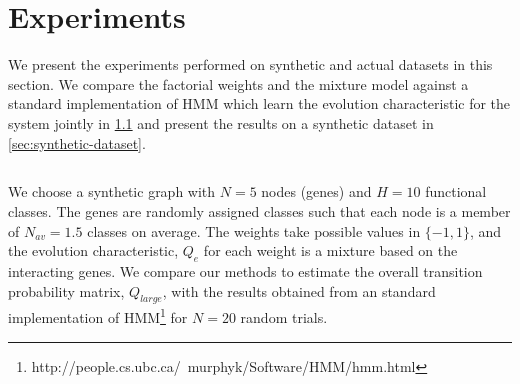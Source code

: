 \documentclass{bioinfo}
\begin{document}
\begin{methods}



\end{methods}
\section{Experiments}
We present the experiments performed on synthetic and actual datasets
in this section. We compare the factorial weights and the mixture
model against a standard implementation of HMM which learn
the evolution characteristic for the system jointly in
\ref{sec:validation} and present the results on a synthetic dataset in \ref{sec:synthetic-dataset}.

\subsection{}
\label{sec:validation}
We choose a synthetic graph with $N=5$ nodes (genes) and $H=10$ functional
classes. The genes are randomly assigned classes  such that each
node is a member of $N_{av}=1.5$ classes on average. The weights take
possible values in $\{-1, 1\}$, and the evolution characteristic, $Q_{e}$ for
each weight is a mixture based on the interacting genes.  We compare our methods to
estimate the overall transition probability matrix, $Q_{large}$, with
the results obtained from an standard implementation of 
HMM\footnote{http://people.cs.ubc.ca/~murphyk/Software/HMM/hmm.html}
for $N=20$ random trials. 
\end{document}
